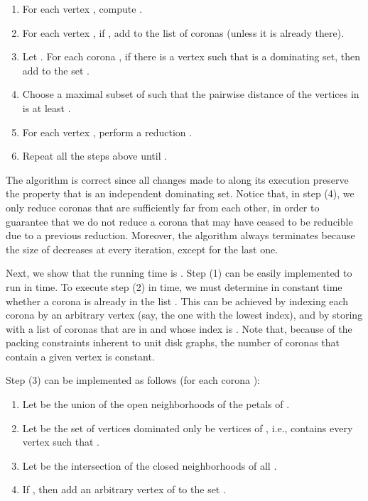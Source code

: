\documentclass[preprint,12pt]{elsarticle}
\begin{document}
\begin{enumerate}[(1)]
\item For each vertex , compute .

\item For each vertex , if , add  to the list of coronas  (unless it is already there).

\item Let . For each corona , if there is a vertex  such that  is a dominating set, then add  to the set .

\item Choose a maximal subset  of  such that the pairwise distance of the vertices in  is at least .

\item For each vertex , perform a reduction .

\item Repeat all the steps above until .
\end{enumerate}

The algorithm is correct since all changes made to  along its execution preserve the property that  is an independent dominating set. Notice that, in step (4), we only reduce coronas that are sufficiently far from each other, in order to guarantee that we do not reduce a corona that may have ceased to be reducible due to a previous reduction. Moreover, the algorithm always terminates because the size of  decreases at every iteration, except for the last one. 

Next, we show that the running time is . 
Step (1) can be easily implemented to run in  time. To execute step (2) in  time, we must determine in constant time whether a corona is already in the list . This can be achieved by indexing each corona  by an arbitrary vertex  (say, the one with the lowest index), and by storing with  a list of coronas that are in  and whose index is . Note that, because of the packing constraints inherent to unit disk graphs, the number of coronas that contain a given vertex is constant.

Step (3) can be implemented as follows (for each corona ):

\begin{enumerate}[(3a)]
\item Let  be the union of the open neighborhoods of the  petals of .

\item Let  be the set of vertices dominated only be vertices of , i.e.,  contains every vertex  such that .

\item Let  be the intersection of the closed neighborhoods  of all .

\item If , then add an arbitrary vertex of  to the set .
\end{enumerate}
\end{document}
